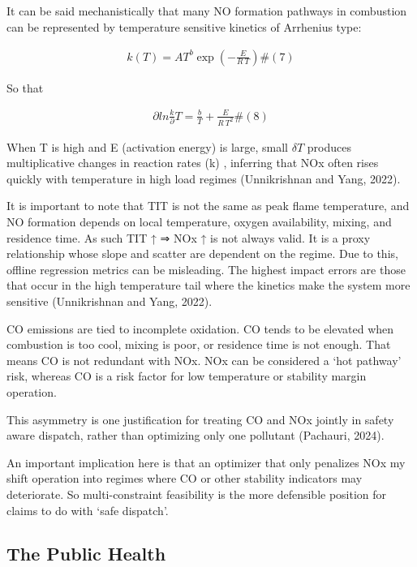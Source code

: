 \documentclass[11pt]{article}
\begin{document}
\subsection{}\label{section-3}

It can be said mechanistically that many NO formation pathways in
combustion can be represented by temperature sensitive kinetics of
Arrhenius type:

\[\begin{array}{r}
k(T) = AT^{b}\exp\left( - \frac{E}{R\ T} \right)\#(7)
\end{array}\]

So that

\[\begin{array}{r}
\partial ln\frac{k}{\partial}T = \frac{b}{T} + \frac{E}{R\ T^{2}}\#(8)
\end{array}\]

When T is high and E (activation energy) is large, small \(\delta T\)
produces multiplicative changes in reaction rates (k) , inferring that
NOx often rises quickly with temperature in high load regimes
(Unnikrishnan and Yang, 2022).

It is important to note that TIT is not the same as peak flame
temperature, and NO formation depends on local temperature, oxygen
availability, mixing, and residence time. As such TIT ↑ ⇒ NOx ↑ is not
always valid. It is a proxy relationship whose slope and scatter are
dependent on the regime. Due to this, offline regression metrics can be
misleading. The highest impact errors are those that occur in the high
temperature tail where the kinetics make the system more sensitive
(Unnikrishnan and Yang, 2022).

CO emissions are tied to incomplete oxidation. CO tends to be elevated
when combustion is too cool, mixing is poor, or residence time is not
enough. That means CO is not redundant with NOx. NOx can be considered a
`hot pathway' risk, whereas CO is a risk factor for low temperature or
stability margin operation.

This asymmetry is one justification for treating CO and NOx jointly in
safety aware dispatch, rather than optimizing only one pollutant
(Pachauri, 2024).

An important implication here is that an optimizer that only penalizes
NOx my shift operation into regimes where CO or other stability
indicators may deteriorate. So multi-constraint feasibility is the more
defensible position for claims to do with `safe dispatch'.

\subsection{The Public Health}\label{the-public-health}
\end{document}

